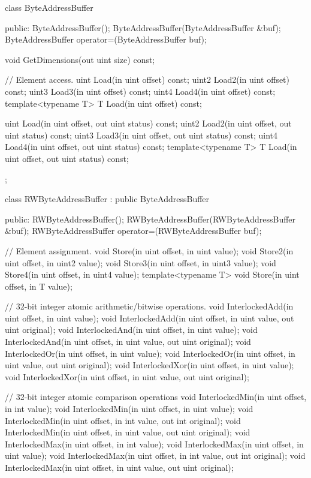 \begin{HLSL}
 class ByteAddressBuffer {
 public:
   ByteAddressBuffer();
   ByteAddressBuffer(ByteAddressBuffer &buf);
   ByteAddressBuffer operator=(ByteAddressBuffer buf);

   void GetDimensions(out uint size) const;

   // Element access.
   uint Load(in uint offset) const;
   uint2 Load2(in uint offset) const;
   uint3 Load3(in uint offset) const;
   uint4 Load4(in uint offset) const;
   template<typename T>
   T Load(in uint offset) const;

   uint Load(in uint offset, out uint status) const;
   uint2 Load2(in uint offset, out uint status) const;
   uint3 Load3(in uint offset, out uint status) const;
   uint4 Load4(in uint offset, out uint status) const;
   template<typename T>
   T Load(in uint offset, out uint status) const;
};

 class RWByteAddressBuffer : public ByteAddressBuffer {
 public:
   RWByteAddressBuffer();
   RWByteAddressBuffer(RWByteAddressBuffer &buf);
   RWByteAddressBuffer operator=(RWByteAddressBuffer buf);

   // Element assignment.
   void Store(in uint offset, in uint value);
   void Store2(in uint offset, in uint2 value);
   void Store3(in uint offset, in uint3 value);
   void Store4(in uint offset, in uint4 value);
   template<typename T>
   void Store(in uint offset, in T value);

   // 32-bit integer atomic arithmetic/bitwise operations.
   void InterlockedAdd(in uint offset, in uint value);
   void InterlockedAdd(in uint offset, in uint value, out uint original);
   void InterlockedAnd(in uint offset, in uint value);
   void InterlockedAnd(in uint offset, in uint value, out uint original);
   void InterlockedOr(in uint offset, in uint value);
   void InterlockedOr(in uint offset, in uint value, out uint original);
   void InterlockedXor(in uint offset, in uint value);
   void InterlockedXor(in uint offset, in uint value, out uint original);

   // 32-bit integer atomic comparison operations
   void InterlockedMin(in uint offset, in int value);
   void InterlockedMin(in uint offset, in uint value);
   void InterlockedMin(in uint offset, in int value, out int original);
   void InterlockedMin(in uint offset, in uint value, out uint original);
   void InterlockedMax(in uint offset, in int value);
   void InterlockedMax(in uint offset, in uint value);
   void InterlockedMax(in uint offset, in int value, out int original);
   void InterlockedMax(in uint offset, in uint value, out uint original);

}
\end{HLSL}

